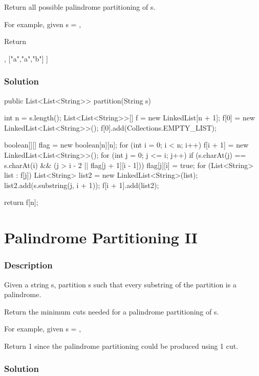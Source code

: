 Return all possible palindrome partitioning of s.

For example, given s = ,

Return
\begin{Code}
[
  ["aa","b"],
  ["a","a","b"]
]
\end{Code}

\subsubsection{Solution}

\begin{Code}
public List<List<String>> partition(String s) {
    int n = s.length();
    List<List<String>>[] f = new LinkedList[n + 1];
    f[0] = new LinkedList<List<String>>();
    f[0].add(Collections.EMPTY_LIST);

    boolean[][] flag = new boolean[n][n];
    for (int i = 0; i < n; i++) {
        f[i + 1] = new LinkedList<List<String>>();
        for (int j = 0; j <= i; j++) {
            if (s.charAt(j) == s.charAt(i) && (j > i - 2 || flag[j + 1][i - 1])) {
                flag[j][i] = true;
                for (List<String> list : f[j]) {
                    List<String> list2 = new LinkedList<String>(list);
                    list2.add(s.substring(j, i + 1));
                    f[i + 1].add(list2);
                }
            }
        }
    }

    return f[n];
}
\end{Code}

\newpage

\section{Palindrome Partitioning II} %

\subsubsection{Description}

Given a string s, partition s such that every substring of the partition is a palindrome.

Return the minimum cuts needed for a palindrome partitioning of s.

For example, given s = ,

Return 1 since the palindrome partitioning \code{["aa","b"]} could be produced using 1 cut.

\subsubsection{Solution}

